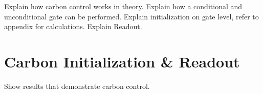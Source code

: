 Explain how carbon control works in theory.
Explain how a conditional and unconditional gate can be performed.
Explain initialization on gate level, refer to appendix for calculations.
Explain Readout.



\section{Carbon Initialization \& Readout}
Show results that demonstrate carbon control.



